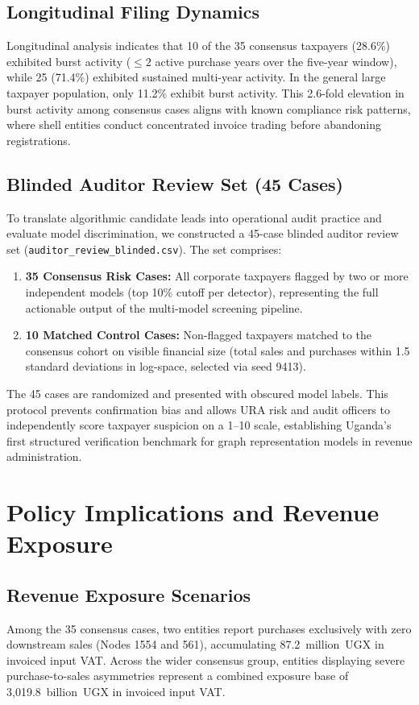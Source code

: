 \documentclass[10pt,twocolumn]{article}
\begin{document}
\subsection{Longitudinal Filing Dynamics}
Longitudinal analysis indicates that 10 of the 35 consensus taxpayers (28.6\%) exhibited burst activity ($\le 2$ active purchase years over the five-year window), while 25 (71.4\%) exhibited sustained multi-year activity. In the general large taxpayer population, only 11.2\% exhibit burst activity. This 2.6-fold elevation in burst activity among consensus cases aligns with known compliance risk patterns, where shell entities conduct concentrated invoice trading before abandoning registrations.

\subsection{Blinded Auditor Review Set (45 Cases)}
To translate algorithmic candidate leads into operational audit practice and evaluate model discrimination, we constructed a 45-case blinded auditor review set (\texttt{auditor\_review\_blinded.csv}). The set comprises:
\begin{enumerate}
  \item \textbf{35 Consensus Risk Cases:} All corporate taxpayers flagged by two or more independent models (top 10\% cutoff per detector), representing the full actionable output of the multi-model screening pipeline.
  \item \textbf{10 Matched Control Cases:} Non-flagged taxpayers matched to the consensus cohort on visible financial size (total sales and purchases within 1.5 standard deviations in log-space, selected via seed 9413).
\end{enumerate}
The 45 cases are randomized and presented with obscured model labels. This protocol prevents confirmation bias and allows URA risk and audit officers to independently score taxpayer suspicion on a 1--10 scale, establishing Uganda's first structured verification benchmark for graph representation models in revenue administration.

\section{Policy Implications and Revenue Exposure}
\label{sec:policy}

\subsection{Revenue Exposure Scenarios}
Among the 35 consensus cases, two entities report purchases exclusively with zero downstream sales (Nodes 1554 and 561), accumulating 87.2~million~UGX in invoiced input VAT. Across the wider consensus group, entities displaying severe purchase-to-sales asymmetries represent a combined exposure base of 3,019.8~billion~UGX in invoiced input VAT.
\end{document}
